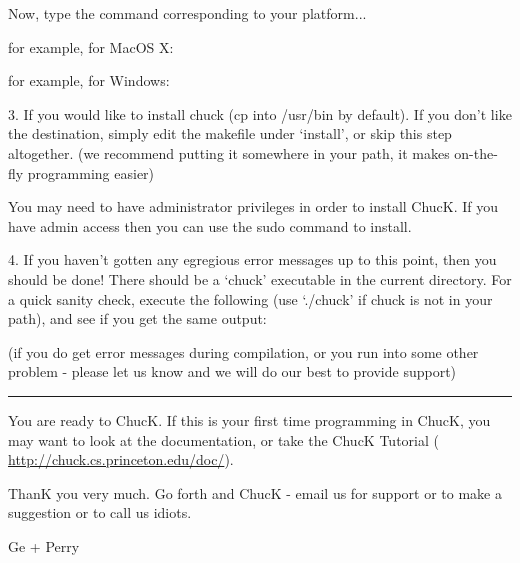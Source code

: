 
Now, type the command corresponding to your platform... 

for example, for MacOS X:


for example, for Windows:


3. If you would like to install chuck (cp into /usr/bin by default). If you 
don't like the destination, simply edit the makefile under `install', or 
skip this step altogether. (we recommend putting it somewhere in your 
path, it makes on-the-fly programming easier)


You may need to have administrator privileges in order to install ChucK. If you 
have admin access then you can use the sudo command to install.


4. If you haven't gotten any egregious error messages up to this point, 
then you should be done! There should be a `chuck' executable in the 
current directory. For a quick sanity check, execute the following (use 
`./chuck' if chuck is not in your path), and see if you get the same output:


(if you do get error messages during compilation, or you run into some 
other problem - please let us know and we will do our best to provide 
support) 

\rule{1in}{.5pt}

You are ready to ChucK. If this is your first time programming in 
ChucK, you may want to look at the documentation, or take the ChucK 
Tutorial ( \href{http://chuck.cs.princeton.edu/doc}{http://chuck.cs.princeton.edu/doc/}). 

ThanK you very much. Go forth and ChucK - email us for support or to make a 
suggestion or to call us idiots.

Ge + Perry
 
